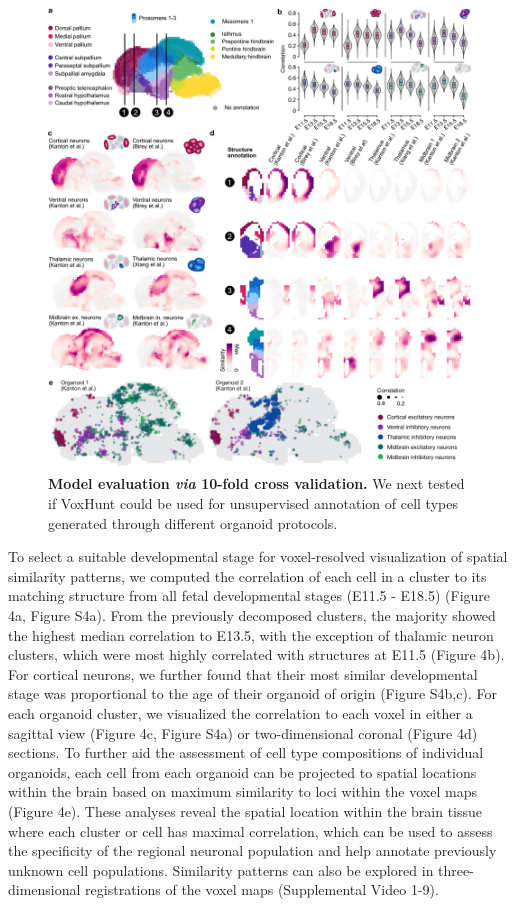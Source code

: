 \begin{figure}[t!]
    \centering
	\includegraphics[width=\textwidth]{figures/voxhunt/Figure_4}
    \caption{\textbf{Model evaluation \textit{via} 10-fold cross validation.} We next tested if VoxHunt could be used for unsupervised annotation of cell types generated through different organoid protocols.}
    \label{fig:vox4}
\end{figure}


To select a suitable developmental stage for voxel-resolved visualization of spatial similarity patterns, we computed the correlation of each cell in a cluster to its matching structure from all fetal developmental stages (E11.5 - E18.5) (Figure 4a, Figure S4a). From the previously decomposed clusters, the majority showed the highest median correlation to E13.5, with the exception of thalamic neuron clusters, which were most highly correlated with structures at E11.5 (Figure 4b). For cortical neurons, we further found that their most similar developmental stage was proportional to the age of their organoid of origin (Figure S4b,c). For each organoid cluster, we visualized the correlation to each voxel in either a sagittal view (Figure 4c, Figure S4a) or two-dimensional coronal (Figure 4d) sections. To further aid the assessment of cell type compositions of individual organoids, each cell from each organoid can be projected to spatial locations within the brain based on maximum similarity to loci within the voxel maps (Figure 4e). These analyses reveal the spatial location within the brain tissue where each cluster or cell has maximal correlation, which can be used to assess the specificity of the regional neuronal population and help annotate previously unknown cell populations. Similarity patterns can also be explored in three-dimensional registrations of the voxel maps (Supplemental Video 1-9). 

